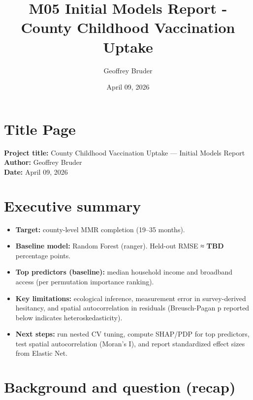 \documentclass[
  11pt,
]{article}
\title{M05 Initial Models Report - County Childhood Vaccination Uptake}
\author{Geoffrey Bruder}
\date{April 09, 2026}
\providecommand{\tightlist}{%
  \setlength{\itemsep}{0pt}\setlength{\parskip}{0pt}}
\begin{document}
\maketitle

{
\setcounter{tocdepth}{2}
\tableofcontents
}
\newpage

\section{Title Page}\label{title-page}

\textbf{Project title:} County Childhood Vaccination Uptake --- Initial
Models Report\\
\textbf{Author:} Geoffrey Bruder\\
\textbf{Date:} April 09, 2026

\newpage

\section{Executive summary}\label{executive-summary}

\begin{itemize}
\tightlist
\item
  \textbf{Target:} county-level MMR completion (19--35 months).\\
\item
  \textbf{Baseline model:} Random Forest (ranger). Held-out RMSE ≈
  \textbf{TBD} percentage points.\\
\item
  \textbf{Top predictors (baseline):} median household income and
  broadband access (per permutation importance ranking).\\
\item
  \textbf{Key limitations:} ecological inference, measurement error in
  survey-derived hesitancy, and spatial autocorrelation in residuals
  (Breusch-Pagan p reported below indicates heteroskedasticity).\\
\item
  \textbf{Next steps:} run nested CV tuning, compute SHAP/PDP for top
  predictors, test spatial autocorrelation (Moran's I), and report
  standardized effect sizes from Elastic Net.
\end{itemize}

\newpage

\section{Background and question
(recap)}\label{background-and-question-recap}
\end{document}
